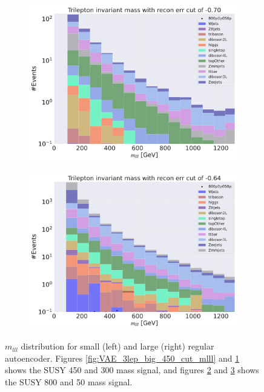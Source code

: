 \begin{figure}[H]
\begin{subfigure}{.45\textwidth}
        \caption{}
        \label{fig:VAE_3lep_small_450_cut_mlll}
    \end{subfigure}
    \hfill
    \begin{subfigure}{.45\textwidth}
        \includegraphics[width=\textwidth]{Figures/VAE_testing/big/3lep/b_data_recon_big_rm3_feats_sig_800p0p050p_mlll_recon_errcut_-0.78.pdf}
        \caption{}
        \label{fig:VAE_3lep_big_800_cut_mlll}
    \end{subfigure}
    \hfill   
    \begin{subfigure}{.45\textwidth}
        \includegraphics[width=\textwidth]{Figures/VAE_testing/small/3lep/b_data_recon_big_rm3_feats_sig_800p0p050p_mlll_recon_errcut_-0.64.pdf}
        \caption{}
        \label{fig:VAE_3lep_small_800_cut_mlll}
    \end{subfigure}
    \hfill      
    \caption[Some $m_{lll}$ cuts for VAE]{$m_{lll}$ distribution for small (left) and large (right) regular autoencoder.
    Figures \ref{fig:VAE_3lep_big_450_cut_mlll} and \ref{fig:VAE_3lep_small_450_cut_mlll} shows the SUSY 450 and 300 mass signal, 
    and figures \ref{fig:VAE_3lep_big_800_cut_mlll} and \ref{fig:VAE_3lep_small_800_cut_mlll} shows the SUSY 800 and 50 mass signal.}
    \label{fig:VAE_3lep_recon_err_both_sig_cut_mlll}
\end{figure}

